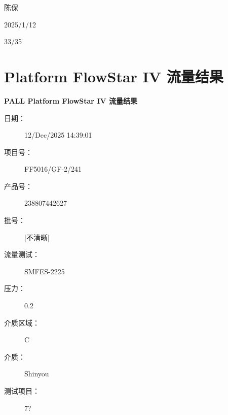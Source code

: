 \documentclass[UTF8,10pt,a4paper,fontset=fandol]{ctexart}
\newcommand{\fieldvalue}[1]{#1}
\newcommand{\handwritten}[1]{#1}
\begin{document}
\handwritten{陈保}

\handwritten{2025/1/12}

\handwritten{33/35}

\newpage

\section{Platform FlowStar IV 流量结果}

\textbf{PALL Platform FlowStar IV 流量结果}

\begin{description}
  \item[日期：]
  \fieldvalue{12/Dec/2025 14:39:01}

  \item[项目号：]
  \fieldvalue{FF5016/GF-2/241}

  \item[产品号：]
  \fieldvalue{238807442627}

  \item[批号：]
  \fieldvalue{[不清晰]}

  \item[流量测试：]
  \fieldvalue{SMFES-2225}

  \item[压力：]
  \fieldvalue{0.2}

  \item[介质区域：]
  \fieldvalue{C}

  \item[介质：]
  \fieldvalue{Shinyou}

  \item[测试项目：]
  \fieldvalue{7?}


\end{description}
\end{document}
